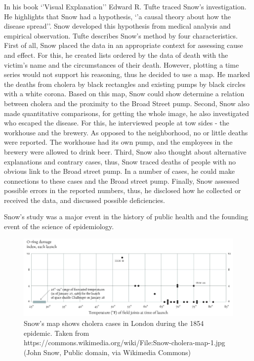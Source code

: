 \documentclass[
]{book}
\begin{document}
In his book `'Visual Explanation'' Edward R. Tufte \citep{tufte1997visualexplanation} traced Snow's investigation. He highlights that Snow had a hypothesis, `'a causal theory about how the disease spread''. Snow developed this hypothesis from medical analysis and empirical observation. Tufte describes Snow's method by four characteristics. First of all, Snow placed the data in an appropriate context for assessing cause and effect. For this, he created lists ordered by the data of death with the victim's name and the circumstances of their death. However, plotting a time series would not support his reasoning, thus he decided to use a map. He marked the deaths from cholera by black rectangles and existing pumps by black circles with a white corona. Based on this map, Snow could show determine a relation between cholera and the proximity to the Broad Street pump. Second, Snow also made quantitative comparisons, for getting the whole image, he also investigated who escaped the disease. For this, he interviewed people at tow sides - the workhouse and the brewery. As opposed to the neighborhood, no or little deaths were reported. The workhouse had its own pump, and the employees in the brewery were allowed to drink beer. Third, Snow also thought about alternative explanations and contrary cases, thus, Snow traced deaths of people with no obvious link to the Broad street pump. In a number of cases, he could make connections to these cases and the Broad street pump. Finally, Snow assessed possible errors in the reported numbers, thus, he disclosed how he collected or received the data, and discussed possible deficiencies.

Snow's study was a major event in the history of public health and the founding event of the science of epidemiology.

\begin{figure}

{\centering \includegraphics[width=1\linewidth]{images/tufte_challenger_o-ring} 

}

\caption{Snow's map shows cholera cases in London during the 1854 epidemic. Taken from https://commons.wikimedia.org/wiki/File:Snow-cholera-map-1.jpg (John Snow, Public domain, via Wikimedia Commons)}\label{fig:unnamed-chunk-3}
\end{figure}
\end{document}
